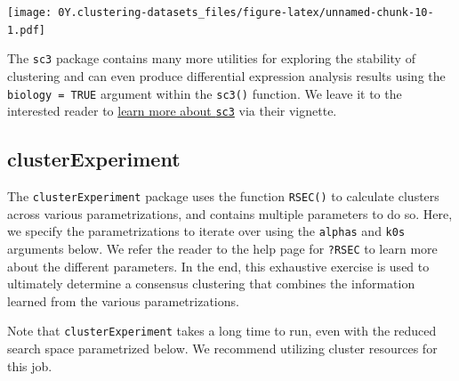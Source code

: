 \documentclass[]{book}
\newenvironment{Shaded}{\begin{snugshade}}{\end{snugshade}}
\newcommand{\DataTypeTok}[1]{\textcolor[rgb]{0.13,0.29,0.53}{#1}}
\newcommand{\DecValTok}[1]{\textcolor[rgb]{0.00,0.00,0.81}{#1}}
\newcommand{\FloatTok}[1]{\textcolor[rgb]{0.00,0.00,0.81}{#1}}
\newcommand{\KeywordTok}[1]{\textcolor[rgb]{0.13,0.29,0.53}{\textbf{#1}}}
\newcommand{\NormalTok}[1]{#1}
\newcommand{\OperatorTok}[1]{\textcolor[rgb]{0.81,0.36,0.00}{\textbf{#1}}}
\newcommand{\StringTok}[1]{\textcolor[rgb]{0.31,0.60,0.02}{#1}}
\begin{document}
\texttt{[image: 0Y.clustering-datasets\_files/figure-latex/unnamed-chunk-10-1.pdf]}

The \texttt{sc3} package contains many more utilities for exploring the stability of clustering and can even produce differential expression analysis results using the \texttt{biology\ =\ TRUE} argument within the \texttt{sc3()} function. We leave it to the interested reader to \href{https://bioconductor.org/packages/release/bioc/html/SC3.html}{learn more about \texttt{sc3}} via their vignette.

\hypertarget{clusterexperiment}{%
\subsection{clusterExperiment}\label{clusterexperiment}}

The \texttt{clusterExperiment} package uses the function \texttt{RSEC()} to calculate clusters across various parametrizations, and contains multiple parameters to do so. Here, we specify the parametrizations to iterate over using the \texttt{alphas} and \texttt{k0s} arguments below. We refer the reader to the help page for \texttt{?RSEC} to learn more about the different parameters. In the end, this exhaustive exercise is used to ultimately determine a consensus clustering that combines the information learned from the various parametrizations.

Note that \texttt{clusterExperiment} takes a long time to run, even with the reduced search space parametrized below. We recommend utilizing cluster resources for this job.

\begin{Shaded}
\end{Shaded}
\end{document}
